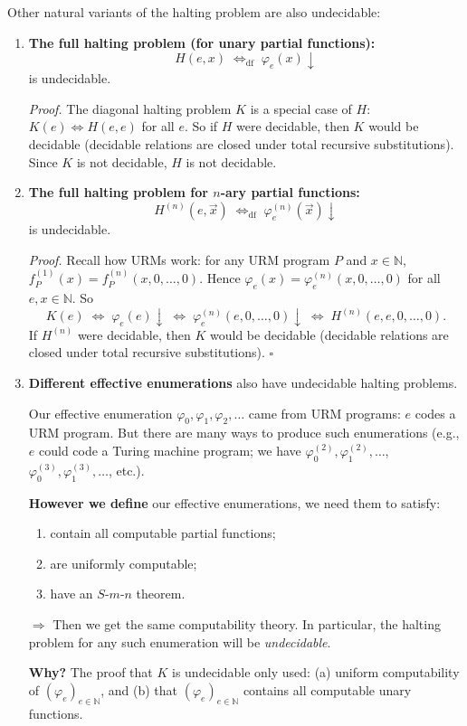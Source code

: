 \documentclass[11pt]{article}
\begin{document}
Other natural variants of the halting problem are also undecidable:

\begin{enumerate}[leftmargin=1.8em, label=\arabic*)]
    \item \textbf{The full halting problem (for unary partial functions):}
    \[
        H(e, x) \;\Leftrightarrow_{\mathrm{df}}\; \varphi_e(x)\downarrow
    \]
    is undecidable.

    \textit{Proof.} The diagonal halting problem $K$ is a special case of $H$: $K(e) \Leftrightarrow H(e, e)$ for all $e$. So if $H$ were decidable, then $K$ would be decidable (decidable relations are closed under total recursive substitutions). Since $K$ is not decidable, $H$ is not decidable.

    \item \textbf{The full halting problem for $n$-ary partial functions:}
    \[
        H^{(n)}(e, \vec{x}) \;\Leftrightarrow_{\mathrm{df}}\; \varphi_e^{(n)}(\vec{x})\downarrow
    \]
    is undecidable.

    \textit{Proof.} Recall how URMs work: for any URM program $P$ and $x \in \mathbb{N}$, $f_P^{(1)}(x) = f_P^{(n)}(x, 0, \ldots, 0)$. Hence $\varphi_e(x) = \varphi_e^{(n)}(x, 0, \ldots, 0)$ for all $e, x \in \mathbb{N}$. So
    \[
        K(e) \;\Leftrightarrow\; \varphi_e(e)\downarrow \;\Leftrightarrow\; \varphi_e^{(n)}(e, 0, \ldots, 0)\downarrow \;\Leftrightarrow\; H^{(n)}(e, e, 0, \ldots, 0).
    \]
    If $H^{(n)}$ were decidable, then $K$ would be decidable (decidable relations are closed under total recursive substitutions). \hfill$\square$

    \item \textbf{Different effective enumerations} also have undecidable halting problems.

    Our effective enumeration $\varphi_0, \varphi_1, \varphi_2, \ldots$ came from URM programs: $e$ codes a URM program. But there are many ways to produce such enumerations (e.g., $e$ could code a Turing machine program; we have $\varphi_0^{(2)}, \varphi_1^{(2)}, \ldots$, $\varphi_0^{(3)}, \varphi_1^{(3)}, \ldots$, etc.).

    \textbf{However we define} our effective enumerations, we need them to satisfy:
    \begin{enumerate}[leftmargin=2em, label=(\arabic*)]
        \item contain all computable partial functions;
        \item are uniformly computable;
        \item have an $S$-$m$-$n$ theorem.
    \end{enumerate}
    $\Rightarrow$ Then we get the same computability theory. In particular, the halting problem for any such enumeration will be \emph{undecidable}.

    \textbf{Why?} The proof that $K$ is undecidable only used: (a) uniform computability of $(\varphi_e)_{e \in \mathbb{N}}$, and (b) that $(\varphi_e)_{e \in \mathbb{N}}$ contains all computable unary functions.
\end{enumerate}
\end{document}
